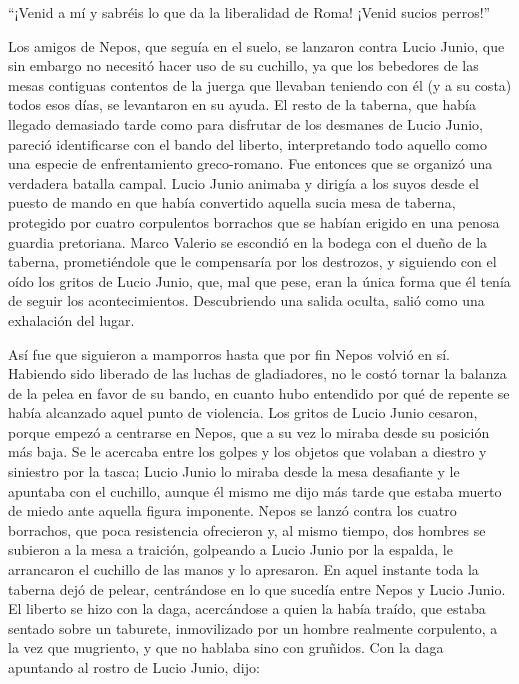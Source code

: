 \documentclass[11pt,openany]{book}
\begin{document}
“¡Venid a mí y sabréis lo que da la liberalidad de Roma! ¡Venid sucios perros!” 

Los amigos de Nepos, que seguía en el suelo, se lanzaron contra Lucio Junio, que sin embargo no necesitó hacer uso de su cuchillo, ya que los bebedores de las mesas contiguas contentos de la juerga que llevaban teniendo con él (y a su costa) todos esos días, se levantaron en su ayuda. El resto de la taberna, que había llegado demasiado tarde como para disfrutar de los desmanes de Lucio Junio, pareció identificarse con el bando del liberto, interpretando todo aquello como una especie de enfrentamiento greco-romano. Fue entonces que se organizó una verdadera batalla campal. Lucio Junio animaba y dirigía a los suyos desde el puesto de mando en que había convertido aquella sucia mesa de taberna, protegido por cuatro corpulentos borrachos que se habían erigido en una penosa guardia pretoriana. Marco Valerio se escondió en la bodega con el dueño de la taberna, prometiéndole que le compensaría por los destrozos, y siguiendo con el oído los gritos de Lucio Junio, que, mal que pese, eran la única forma que él tenía de seguir los acontecimientos. Descubriendo una salida oculta, salió como una exhalación del lugar.

Así fue que siguieron a mamporros hasta que por fin Nepos volvió en sí. Habiendo sido liberado de las luchas de gladiadores, no le costó tornar la balanza de la pelea en favor de su bando, en cuanto hubo entendido por qué de repente se había alcanzado aquel punto de violencia. Los gritos de Lucio Junio cesaron, porque empezó a centrarse en Nepos, que a su vez lo miraba desde su posición más baja. Se le acercaba entre los golpes y los objetos que volaban a diestro y siniestro por la tasca; Lucio Junio lo miraba desde la mesa desafiante y le apuntaba con el cuchillo, aunque él mismo me dijo más tarde que estaba muerto de miedo ante aquella figura imponente. Nepos se lanzó contra los cuatro borrachos, que poca resistencia ofrecieron y, al mismo tiempo, dos hombres se subieron a la mesa a traición, golpeando a Lucio Junio por la espalda, le arrancaron el cuchillo de las manos y lo apresaron. En aquel instante toda la taberna dejó de pelear, centrándose en lo que sucedía entre Nepos y Lucio Junio. El liberto se hizo con la daga, acercándose a quien la había traído, que estaba sentado sobre un taburete, inmovilizado por un hombre realmente corpulento, a la vez que mugriento, y que no hablaba sino con gruñidos. Con la daga apuntando al rostro de Lucio Junio, dijo: 
\end{document}
